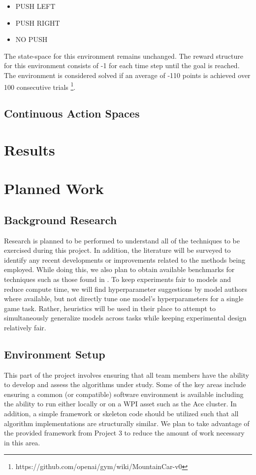 \documentclass[conference]{IEEEtran}
\begin{document}
\begin{itemize}
    \item PUSH LEFT
    \item PUSH RIGHT
    \item NO PUSH
\end{itemize}

The state-space for this environment remains unchanged.
The reward structure for this environment consists of -1 for each time step until the goal is reached.
The environment is considered solved if an average of -110 points is achieved over 100 consecutive trials \footnote{https://github.com/openai/gym/wiki/MountainCar-v0}.

\subsection{Continuous Action Spaces}

\section{Results} \label{results}

\section{Planned Work} \label{planned}

\subsection{Background Research}
Research is planned to be performed to understand all of the techniques to be exercised during this project.
In addition, the literature will be surveyed to identify any recent developments or improvements related to the methods being employed.
While doing this, we also plan to obtain available benchmarks for techniques such as those found in \cite{DQNOriginalPaper, NatureDeepLearning, bhonker2017playing}.
To keep experiments fair to models and reduce compute time, we will find hyperparameter suggestions by model authors where available, but not directly tune one model's hyperparameters for a single game task. Rather, heuristics will be used in their place to attempt to simultaneously generalize models across tasks while keeping experimental design relatively fair.

\subsection{Environment Setup}
This part of the project involves ensuring that all team members have the ability to develop and assess the algorithms under study.
Some of the key areas include ensuring a common (or compatible) software environment is available including the ability to run \cite{nichol2018retro} either locally or on a WPI asset such as the Ace cluster.
In addition, a simple framework or skeleton code should be utilized such that all algorithm implementations are structurally similar.
We plan to take advantage of the provided framework from Project 3 to reduce the amount of work necessary in this area.
\end{document}

